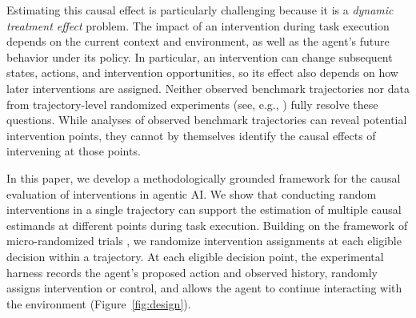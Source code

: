 Estimating this causal effect is particularly challenging because it is a {\em dynamic treatment effect} problem.
The impact of an intervention during task execution depends on the current context and environment, as well as the agent's future behavior under its policy.
In particular, an intervention can change subsequent states, actions, and intervention opportunities, so its effect also depends on how later interventions are assigned.
Neither observed benchmark trajectories nor data from trajectory-level randomized experiments (see, e.g., \cite{arena2026agentarena,camuffo2026beyond,lu2026agent}) fully resolve these questions.
While analyses of observed benchmark trajectories can reveal potential intervention points, they cannot by themselves identify the causal effects of intervening at those points.


In this paper, we develop a methodologically grounded framework for the causal evaluation of interventions in agentic AI.
We show that conducting random interventions in a single trajectory can support the estimation of multiple causal estimands at different points during task execution.
Building on the framework of micro-randomized trials \citep{klasnja2015mrt}, we randomize intervention assignments at each eligible decision within a trajectory.
At each eligible decision point, the experimental harness records the agent's proposed action and observed history, randomly assigns intervention or control, and allows the agent to continue interacting with the environment (Figure~\ref{fig:design}). 

